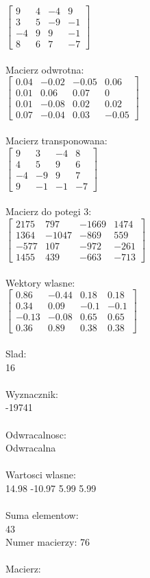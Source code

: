 \documentclass[a4paper,12pt]{article}
\begin{document}
$\begin{bmatrix} 9&4&-4&9\\3&5&-9&-1\\-4&9&9&-1\\8&6&7&-7 \end{bmatrix}$
\\
\\
Macierz odwrotna:\\

$\begin{bmatrix} 0.04&-0.02&-0.05&0.06\\0.01&0.06&0.07&0\\0.01&-0.08&0.02&0.02\\0.07&-0.04&0.03&-0.05 \end{bmatrix}$
\\
\\
Macierz transponowana:\\

$\begin{bmatrix} 9&3&-4&8\\4&5&9&6\\-4&-9&9&7\\9&-1&-1&-7 \end{bmatrix}$
\\
\\
Macierz do potegi 3:\\

$\begin{bmatrix} 2175&797&-1669&1474\\1364&-1047&-869&559\\-577&107&-972&-261\\1455&439&-663&-713 \end{bmatrix}$
\\
\\
Wektory wlasne:\\

$\begin{bmatrix} 0.86&-0.44&0.18&0.18\\0.34&0.09&-0.1&-0.1\\-0.13&-0.08&0.65&0.65\\0.36&0.89&0.38&0.38 \end{bmatrix}$
\\
\\
Slad:\\
16
\\
\\
Wyznacznik:\\
-19741
\\
\\
Odwracalnosc:\\
Odwracalna
\\
\\
Wartosci wlasne:\\
14.98 -10.97 5.99 5.99
\\
\\
Suma elementow:\\
43
\\
\newpage
Numer macierzy:
76
\\
\\
Macierz:\\
\end{document}
